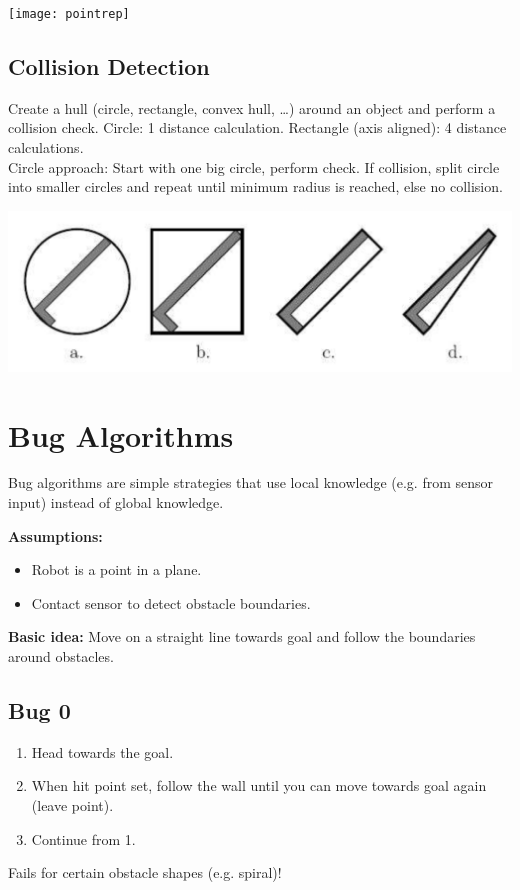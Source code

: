 \begin{multicols*}{2}
\begin{center}
\texttt{[image: pointrep]}
\end{center}

\subsection{Collision Detection}
Create a hull (circle, rectangle, convex hull, …) around an object and
perform a collision check. Circle: 1 distance calculation. Rectangle (axis aligned): 4 distance calculations.\\
Circle approach: Start with one big circle, perform check. If collision, split circle into smaller circles and repeat until minimum radius is reached, else no collision.

\begin{center}
\includegraphics[width=\columnwidth]{collision_hull.png}
\end{center}

\section{Bug Algorithms}
Bug algorithms are simple strategies that use local knowledge (e.g. from sensor input) instead of global knowledge.\par

\textbf{Assumptions:}
\begin{itemize}
	\item Robot is a point in a plane.
	\item Contact sensor to detect obstacle boundaries.
\end{itemize}

\textbf{Basic idea:} Move on a straight line towards goal and follow the boundaries around obstacles.

\subsection{Bug 0}
\begin{enumerate}
	\item Head towards the goal.
	\item When hit point set, follow the wall until you can move towards goal again (leave point).
	\item Continue from 1.
\end{enumerate}
Fails for certain obstacle shapes (e.g. spiral)!


\end{multicols*}
